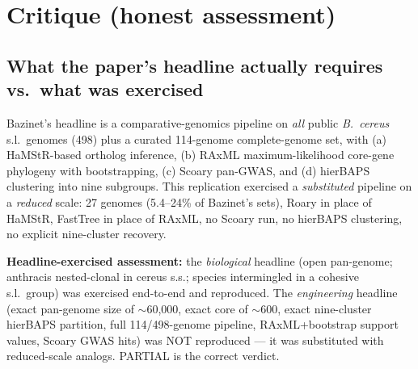 \documentclass[11pt]{article}
\begin{document}
\section{Critique (honest assessment)}

\subsection{What the paper's headline actually requires vs.\ what was exercised}
Bazinet's headline is a comparative-genomics pipeline on \emph{all} public \emph{B.\ cereus} s.l.\ genomes (498) plus a curated 114-genome complete-genome set, with (a) HaMStR-based ortholog inference, (b) RAxML maximum-likelihood core-gene phylogeny with bootstrapping, (c) Scoary pan-GWAS, and (d) hierBAPS clustering into nine subgroups. This replication exercised a \emph{substituted} pipeline on a \emph{reduced} scale: 27 genomes (5.4--24\% of Bazinet's sets), Roary in place of HaMStR, FastTree in place of RAxML, no Scoary run, no hierBAPS clustering, no explicit nine-cluster recovery.

\textbf{Headline-exercised assessment:} the \emph{biological} headline (open pan-genome; anthracis nested-clonal in cereus s.s.; species intermingled in a cohesive s.l.\ group) was exercised end-to-end and reproduced. The \emph{engineering} headline (exact pan-genome size of $\sim$60{,}000, exact core of $\sim$600, exact nine-cluster hierBAPS partition, full 114/498-genome pipeline, RAxML+bootstrap support values, Scoary GWAS hits) was NOT reproduced --- it was substituted with reduced-scale analogs. PARTIAL is the correct verdict.
\end{document}
